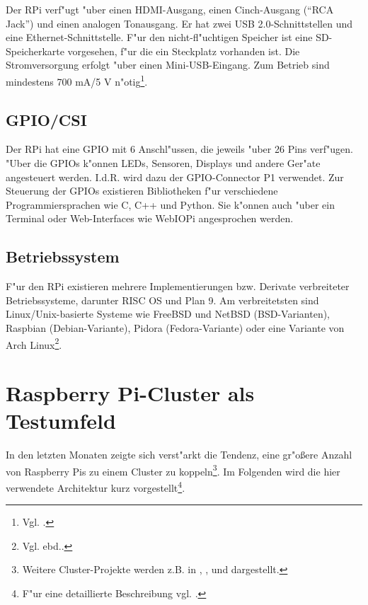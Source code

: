 Der RPi verf"ugt "uber einen HDMI-Ausgang, einen Cinch-Ausgang ("`RCA Jack"') und einen analogen Tonausgang. Er hat zwei USB 2.0-Schnittstellen und eine Ethernet-Schnittstelle. F"ur den nicht-fl"uchtigen Speicher ist eine SD-Speicherkarte vorgesehen, f"ur die ein Steckplatz vorhanden ist. Die Stromversorgung erfolgt "uber einen Mini-USB-Eingang. Zum Betrieb sind mindestens 700 mA/5 V n"otig\footnote{Vgl. \cite{pow12}.}. 

\subsection{GPIO/CSI}\label{RPi GPIO} 

Der RPi hat eine GPIO mit 6 Anschl"ussen, die jeweils "uber 26 Pins verf"ugen. "Uber die GPIOs k"onnen LEDs, Sensoren, Displays und andere Ger"ate angesteuert werden. I.d.R. wird dazu der GPIO-Connector P1 verwendet. Zur Steuerung der GPIOs existieren Bibliotheken f"ur verschiedene Programmiersprachen wie C, C++ und Python. Sie k"onnen auch "uber ein Terminal oder Web-Interfaces wie WebIOPi angesprochen werden. 


\subsection{Betriebssystem}\label{RPi OS}

F"ur den RPi existieren mehrere Implementierungen bzw. Derivate verbreiteter Betriebssysteme, darunter RISC OS und Plan 9. Am verbreitetsten sind Linux/Unix-basierte Systeme wie FreeBSD und NetBSD (BSD-Varianten), Raspbian (Debian-Variante), Pidora (Fedora-Variante) oder eine Variante von Arch Linux\footnote{Vgl. ebd..}.   

\section{Raspberry Pi-Cluster als Testumfeld}\label{Spezifikation Bramble}

In den letzten Monaten zeigte sich verst"arkt die Tendenz, eine gr"o\ss ere Anzahl von Raspberry Pis zu einem Cluster zu koppeln\footnote{Weitere Cluster-Projekte werden z.B. in \cite{cox13}, \cite{kie01}, \cite{bal12} und \cite{ou13} dargestellt.}. Im Folgenden wird die hier verwendete Architektur kurz vorgestellt\footnote{F"ur eine detaillierte Beschreibung vgl. \cite{kli13}.}. 

